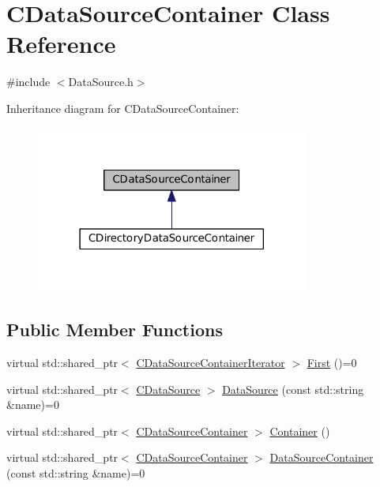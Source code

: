 \hypertarget{classCDataSourceContainer}{}\section{C\+Data\+Source\+Container Class Reference}
\label{classCDataSourceContainer}


{\ttfamily \#include $<$Data\+Source.\+h$>$}



Inheritance diagram for C\+Data\+Source\+Container\+:
\nopagebreak
\begin{figure}[H]
\begin{center}
\leavevmode
\includegraphics[width=254pt]{classCDataSourceContainer__inherit__graph}
\end{center}
\end{figure}
\subsection*{Public Member Functions}
\begin{DoxyCompactItemize}
\item 
virtual std\+::shared\+\_\+ptr$<$ \hyperlink{classCDataSourceContainerIterator}{C\+Data\+Source\+Container\+Iterator} $>$ \hyperlink{classCDataSourceContainer_ad50184dd4ec1c79c776fe0d7d9910925}{First} ()=0
\item 
virtual std\+::shared\+\_\+ptr$<$ \hyperlink{classCDataSource}{C\+Data\+Source} $>$ \hyperlink{classCDataSourceContainer_aea214236c4ed2aef231072b909982f7d}{Data\+Source} (const std\+::string \&name)=0
\item 
virtual std\+::shared\+\_\+ptr$<$ \hyperlink{classCDataSourceContainer}{C\+Data\+Source\+Container} $>$ \hyperlink{classCDataSourceContainer_a040c80f46e9d2df36b494290a945e61a}{Container} ()
\item 
virtual std\+::shared\+\_\+ptr$<$ \hyperlink{classCDataSourceContainer}{C\+Data\+Source\+Container} $>$ \hyperlink{classCDataSourceContainer_abebf1b9a6168b6783ee9753df612e511}{Data\+Source\+Container} (const std\+::string \&name)=0
\end{DoxyCompactItemize}


